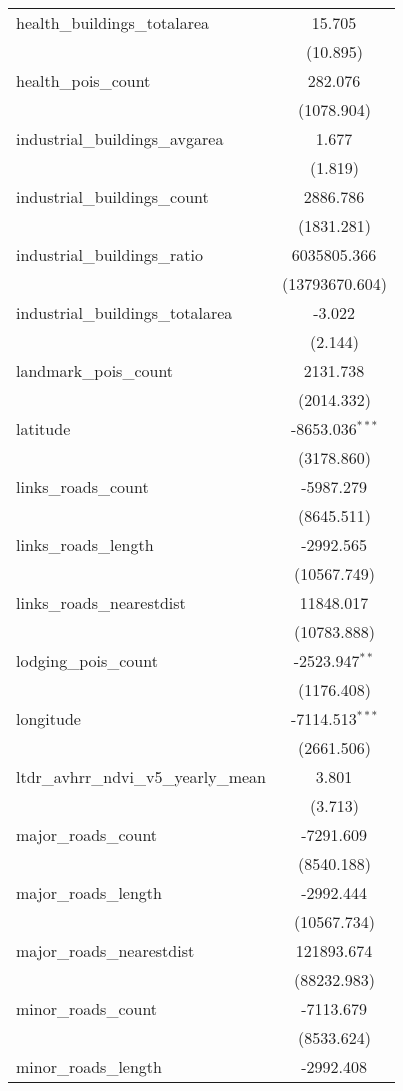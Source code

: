 \begin{table}[!htbp]
\begin{tabular}{@{\extracolsep{5pt}}lc}
 health_buildings_totalarea & 15.705$^{}$ \\
  & (10.895) \\
 health_pois_count & 282.076$^{}$ \\
  & (1078.904) \\
 industrial_buildings_avgarea & 1.677$^{}$ \\
  & (1.819) \\
 industrial_buildings_count & 2886.786$^{}$ \\
  & (1831.281) \\
 industrial_buildings_ratio & 6035805.366$^{}$ \\
  & (13793670.604) \\
 industrial_buildings_totalarea & -3.022$^{}$ \\
  & (2.144) \\
 landmark_pois_count & 2131.738$^{}$ \\
  & (2014.332) \\
 latitude & -8653.036$^{***}$ \\
  & (3178.860) \\
 links_roads_count & -5987.279$^{}$ \\
  & (8645.511) \\
 links_roads_length & -2992.565$^{}$ \\
  & (10567.749) \\
 links_roads_nearestdist & 11848.017$^{}$ \\
  & (10783.888) \\
 lodging_pois_count & -2523.947$^{**}$ \\
  & (1176.408) \\
 longitude & -7114.513$^{***}$ \\
  & (2661.506) \\
 ltdr_avhrr_ndvi_v5_yearly_mean & 3.801$^{}$ \\
  & (3.713) \\
 major_roads_count & -7291.609$^{}$ \\
  & (8540.188) \\
 major_roads_length & -2992.444$^{}$ \\
  & (10567.734) \\
 major_roads_nearestdist & 121893.674$^{}$ \\
  & (88232.983) \\
 minor_roads_count & -7113.679$^{}$ \\
  & (8533.624) \\
 minor_roads_length & -2992.408$^{}$ \\

\end{tabular}
\end{table}
